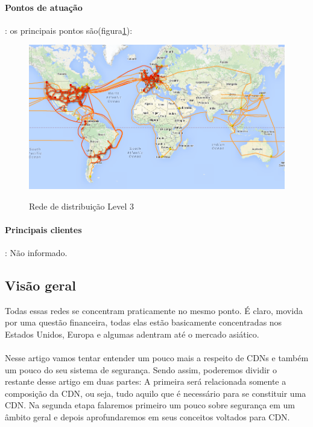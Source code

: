 \paragraph{Pontos de atua\c{c}\~ao}: os principais pontos s\~ao(figura\ref{figura:level3_map}):
\begin{figure}[H]
\caption{Rede de distribui\c{c}\~ao Level 3}
\includegraphics[width=14cm]{Figuras/level3_map.png} 
\label{figura:level3_map}
\end{figure}
\paragraph{Principais clientes}: N\~ao informado.
\subsection{Vis\~ao geral}
Todas essas redes se concentram praticamente no mesmo ponto. \'E claro, movida por uma quest\~ao financeira, todas elas est\~ao basicamente concentradas nos Estados Unidos, Europa e algumas adentram at\'e o mercado asi\'atico.
\paragraph{}
Nesse artigo vamos tentar entender um pouco mais a respeito de CDNs e tamb\'em um pouco do seu sistema de seguran\c{c}a. Sendo assim, poderemos dividir o restante desse artigo em duas partes: A primeira ser\'a relacionada somente a composi\c{c}\~ao da CDN, ou seja, tudo aquilo que \'e necess\'ario para se constituir uma CDN. Na segunda etapa falaremos primeiro um pouco sobre seguran\c{c}a em um \^ambito geral e depois aprofundaremos em seus conceitos voltados para CDN.